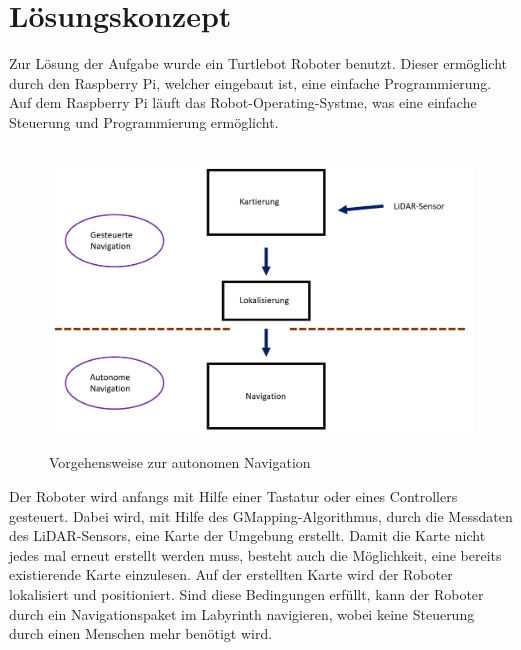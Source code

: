 \section{Lösungskonzept}
{
	Zur Lösung der Aufgabe wurde ein Turtlebot Roboter benutzt. Dieser ermöglicht durch den Raspberry Pi, welcher eingebaut ist, eine einfache Programmierung. Auf dem Raspberry Pi läuft das Robot-Operating-Systme, was eine einfache Steuerung und Programmierung ermöglicht.
	\begin{figure}[H]
		\centering
		\includegraphics[height=8cm]{Bilder/overview_concept.png}
		\caption{Vorgehensweise zur autonomen Navigation} 
		\label{pic:overviewconcept}
	\end{figure}
Der Roboter wird anfangs mit Hilfe einer Tastatur oder eines Controllers gesteuert. Dabei wird, mit Hilfe des GMapping-Algorithmus, durch die Messdaten des LiDAR-Sensors, eine Karte der Umgebung erstellt. Damit die Karte nicht jedes mal erneut erstellt werden muss, besteht auch die Möglichkeit, eine bereits existierende Karte einzulesen. Auf der erstellten Karte wird der Roboter lokalisiert und positioniert. Sind diese Bedingungen erfüllt, kann der Roboter durch ein Navigationspaket im Labyrinth navigieren, wobei keine Steuerung durch einen Menschen mehr benötigt wird.
}